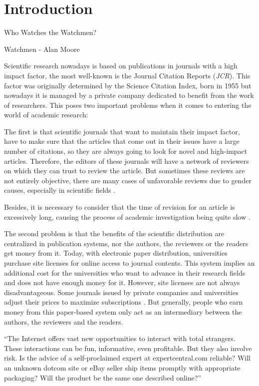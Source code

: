 \chapter{Introduction}

\begin{FraseCelebre}
  \begin{Frase}
    Who Watches the Watchmen?
  \end{Frase}
  \begin{Fuente}
    Watchmen - Alan Moore
  \end{Fuente}
\end{FraseCelebre}

Scientific research nowadays is based on publications in journals with a high
impact factor\cite{doi:10.1001/jama.295.1.90}, the most well-known is the
Journal Citation Reports (\emph{JCR}). This factor was originally determined by
the Science Citation Index, born in 1955\cite{garfield2007evolution} but
nowadays it is managed by a private company dedicated to benefit from the work
of researchers\cite{toledo2011book}. This poses two important problems when it
comes to entering the world of academic research:

The first is that scientific journals that want to maintain their impact factor,
have to make sure that the articles that come out in their issues have a large
number of citations, so they are always going to look for novel and high-impact
articles. Therefore, the editors of these journals will have a network of
reviewers on which they can trust to review the article. But sometimes these
reviews are not entirely objective, there are many cases of unfavorable reviews
due to gender causes, especially in scientific fields
\cite{wenneras2001nepotism}.

Besides, it is necessary to consider that the time of revision for an article is
excessively long, causing the process of academic investigation being quite slow
\cite{huisman2017duration}.

The second problem is that the benefits of the scientific distribution are
centralized in publication systems, nor the authors, the reviewers or the
readers get money from it. Today, with electronic paper distribution,
universities purchase site licenses for online access to journal contents. This
system implies an additional cost for the universities who want to advance in
their research fields and does not have enough money for it. However, site
licenses are not always disadvantageous. Some journals issued by private
companies and universities adjust their prices to maximize subscriptions
\cite{bergstrom2004costs}. But generally, people who earn money from this
paper-based system only act as an intermediary between the authors, the
reviewers and the readers.

``The Internet offers vast new opportunities to interact with total strangers.
These interactions can be fun, informative, even profitable. But they also
involve risk. Is the advice of a self-proclaimed expert at expertcentral.com
reliable? Will an unknown dotcom site or eBay seller ship items promptly with
appropriate packaging? Will the product be the same one described online?''
\cite{resnick2000reputation}


